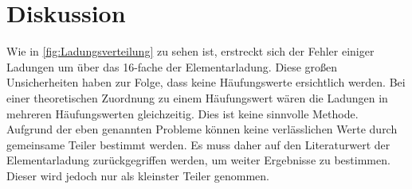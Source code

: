 


\section{Diskussion}
\label{sec:Diskussion}

Wie in \autoref{fig:Ladungsverteilung} zu sehen ist, erstreckt sich der Fehler einiger Ladungen um über das 16-fache der Elementarladung. 
Diese großen Unsicherheiten haben zur Folge, dass keine Häufungswerte ersichtlich werden. Bei einer theoretischen Zuordnung zu einem Häufungswert wären 
die Ladungen in mehreren Häufungswerten gleichzeitig. Dies ist keine sinnvolle Methode.
Aufgrund der eben genannten Probleme können keine verlässlichen Werte durch gemeinsame Teiler bestimmt werden. Es muss daher auf den 
Literaturwert der Elementarladung zurückgegriffen werden, um weiter Ergebnisse zu bestimmen. Dieser wird jedoch nur als kleinster Teiler genommen. 



